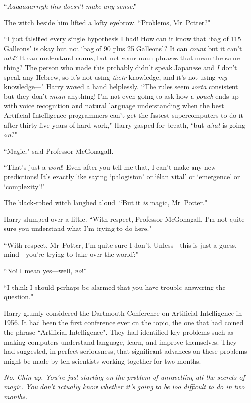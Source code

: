 ``\emph{Aaaaaaarrrgh this doesn't make any sense!}"

The witch beside him lifted a lofty eyebrow. ``Problems, Mr~Potter?"

``I just falsified every single hypothesis I had! How can it know that `bag of 115 Galleons' is okay but not `bag of 90 plus 25 Galleons'? It can \emph{count} but it can't \emph{add}? It can understand nouns, but not some noun phrases that mean the same thing? The person who made this probably didn't speak Japanese and \emph{I} don't speak any Hebrew, so it's not using \emph{their} knowledge, and it's not using \emph{my} knowledge—" Harry waved a hand helplessly. ``The rules seem \emph{sorta} consistent but they don't \emph{mean} anything! I'm not even going to ask how a \emph{pouch} ends up with voice recognition and natural language understanding when the best Artificial Intelligence programmers can't get the fastest supercomputers to do it after thirty-five years of hard work," Harry gasped for breath, ``but \emph{what} is going \emph{on}?"

``Magic," said Professor McGonagall.

``That's just a \emph{word}! Even after you tell me that, I can't make any new predictions! It's exactly like saying `phlogiston' or `élan vital' or `emergence' or `complexity'!"

The black-robed witch laughed aloud. ``But it \emph{is} magic, Mr~Potter."

Harry slumped over a little. ``With respect, Professor McGonagall, I'm not quite sure you understand what I'm trying to do here."

``With respect, Mr~Potter, I'm quite sure I don't. Unless—this is just a guess, mind—you're trying to take over the world?"

``No! I mean yes—well, \emph{no}!"

``I think I should perhaps be alarmed that you have trouble answering the question."

Harry glumly considered the Dartmouth Conference on Artificial Intelligence in 1956. It had been the first conference ever on the topic, the one that had coined the phrase ``Artificial Intelligence". They had identified key problems such as making computers understand language, learn, and improve themselves. They had suggested, in perfect seriousness, that significant advances on these problems might be made by ten scientists working together for two months.

\emph{No. Chin up. You're just \emph{starting} on the problem of unravelling all the secrets of magic. You don't actually \emph{know} whether it's going to be too difficult to do in two months.}

